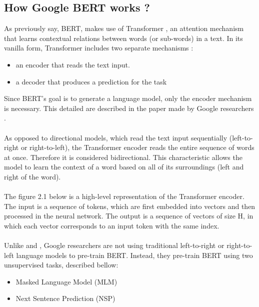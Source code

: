 \subsection{How Google BERT works ?}
As previously say, BERT,  makes use of Transformer  \cite{Vaswani2017}, an attention mechanism that learns contextual relations between words (or sub-words) in a text. In its vanilla form, Transformer includes two separate mechanisms : 

\begin{itemize}
\item an encoder that reads the text input.
\item a decoder that produces a prediction for the task
\end{itemize}

Since BERT’s goal is to generate a language model, only the encoder mechanism is necessary. This detailed are described in the paper made by Google researchers \citeauthor{Devlin2018} \cite{Devlin2018}. \\
\\
As opposed to directional models, which read the text input sequentially (left-to-right or right-to-left), the Transformer encoder reads the entire sequence of words at once. Therefore it is considered bidirectional. This characteristic allows the model to learn the context of a word based on all of its surroundings (left and right of the word).\\
\\
The figure 2.1 below is a high-level representation of the Transformer encoder. The input is a sequence of tokens, which are first embedded into vectors and then processed in the neural network. The output is a sequence of vectors of size H, in which each vector corresponds to an input token with the same index. \\
\\
Unlike \citeauthor{Peters2018} and \citeauthor{Radford2018}, Google researchers are not using traditional left-to-right or right-to-left language models to pre-train BERT. Instead, they pre-train BERT using two unsupervised tasks, described bellow:

\begin{itemize}
\item Masked Language Model (MLM)
\item Next Sentence Prediction (NSP)
\end{itemize}

